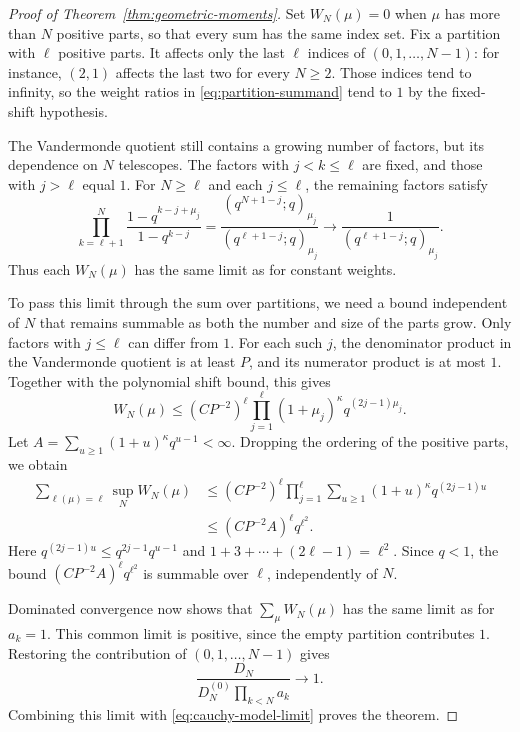 \documentclass[11pt]{article}
\begin{document}
\begin{proof}[Proof of Theorem~\ref{thm:geometric-moments}]
Set $W_N(\mu)=0$ when $\mu$ has more than $N$ positive parts,
so that every sum has the same index set. Fix a partition with
$\ell$ positive parts. It affects only the last $\ell$ indices
of $(0,1,\ldots,N-1)$: for instance, $(2,1)$ affects the last two
for every $N\ge2$. Those indices tend to infinity, so the weight
ratios in \eqref{eq:partition-summand} tend to $1$ by the fixed-shift hypothesis.

The Vandermonde quotient still contains a growing number of factors,
but its dependence on $N$ telescopes. The factors with $j<k\le\ell$
are fixed, and those with $j>\ell$ equal $1$. For $N\ge\ell$ and
each $j\le\ell$, the remaining factors satisfy
\begin{equation}\label{eq:partition-tail}
 \prod_{k=\ell+1}^{N}
 \frac{1-q^{k-j+\mu_j}}{1-q^{k-j}}
 =\frac{(q^{N+1-j};q)_{\mu_j}}{(q^{\ell+1-j};q)_{\mu_j}}
 \longrightarrow\frac1{(q^{\ell+1-j};q)_{\mu_j}}.
\end{equation}
Thus each $W_N(\mu)$ has the same limit as for constant weights.

To pass this limit through the sum over partitions, we need a bound
independent of $N$ that remains summable as both the number and size
of the parts grow. Only factors with $j\le\ell$ can differ from $1$.
For each such $j$, the denominator product in the Vandermonde
quotient is at least $P$, and its numerator product is at most $1$.
Together with the polynomial shift bound, this gives
\[
 W_N(\mu)\le(CP^{-2})^\ell
 \prod_{j=1}^\ell(1+\mu_j)^\kappa q^{(2j-1)\mu_j}.
\]
Let $A=\sum_{u\ge1}(1+u)^\kappa q^{u-1}<\infty$.
Dropping the ordering of the positive parts, we obtain
\begin{align*}
 \sum_{\ell(\mu)=\ell}\sup_N W_N(\mu)
 &\le(CP^{-2})^\ell\prod_{j=1}^\ell
       \sum_{u\ge1}(1+u)^\kappa q^{(2j-1)u}\\
 &\le(CP^{-2}A)^\ell q^{\ell^2}.
\end{align*}
Here $q^{(2j-1)u}\le q^{2j-1}q^{u-1}$ and
$1+3+\cdots+(2\ell-1)=\ell^2$. Since $q<1$, the bound
$(CP^{-2}A)^\ell q^{\ell^2}$ is summable over $\ell$,
independently of $N$.

Dominated convergence now shows that $\sum_\mu W_N(\mu)$ has
the same limit as for $a_k=1$. This common limit is positive, since the
empty partition contributes $1$. Restoring the contribution of $(0,1,\ldots,N-1)$ gives
\[
 \frac{D_N}{D_N^{(0)}\prod_{k<N}a_k}\longrightarrow1.
\]
Combining this limit with \eqref{eq:cauchy-model-limit} proves
the theorem.
\end{proof}
\end{document}
